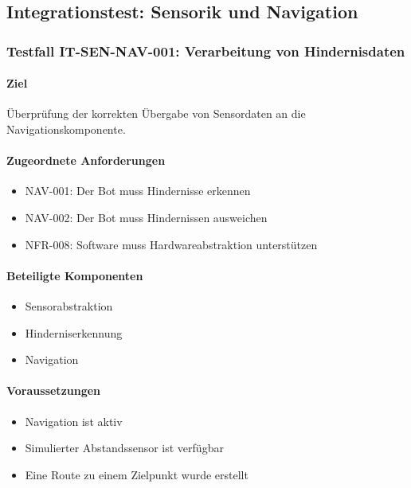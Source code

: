 \documentclass[
  a4paper,
  12pt,
  DIV=12,        %
  parskip=half,  %
  headings=small %
]{scrartcl}
\theoremstyle{definition}
\providecommand{\tightlist}{%
  \setlength{\itemsep}{0pt}\setlength{\parskip}{0pt}}
\theoremstyle{definition}
\begin{document}
\subsection{Integrationstest: Sensorik und
Navigation}\label{integrationstest-sensorik-und-navigation}

\subsubsection{Testfall IT-SEN-NAV-001: Verarbeitung von
Hindernisdaten}\label{testfall-it-sen-nav-001-verarbeitung-von-hindernisdaten}

\paragraph{Ziel}\label{ziel-9}

Überprüfung der korrekten Übergabe von Sensordaten an die
Navigationskomponente.

\paragraph{Zugeordnete Anforderungen}\label{zugeordnete-anforderungen-9}

\begin{itemize}
\tightlist
\item
  NAV-001: Der Bot muss Hindernisse erkennen
\item
  NAV-002: Der Bot muss Hindernissen ausweichen
\item
  NFR-008: Software muss Hardwareabstraktion unterstützen
\end{itemize}

\paragraph{Beteiligte Komponenten}\label{beteiligte-komponenten}

\begin{itemize}
\tightlist
\item
  Sensorabstraktion
\item
  Hinderniserkennung
\item
  Navigation
\end{itemize}

\paragraph{Voraussetzungen}\label{voraussetzungen-9}

\begin{itemize}
\tightlist
\item
  Navigation ist aktiv
\item
  Simulierter Abstandssensor ist verfügbar
\item
  Eine Route zu einem Zielpunkt wurde erstellt
\end{itemize}
\end{document}
